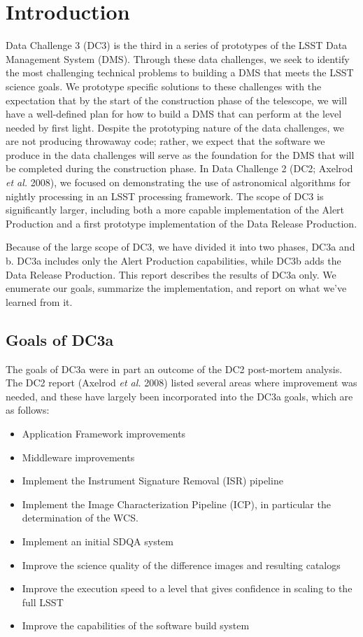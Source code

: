 
\section{Introduction}

Data Challenge 3 (DC3) is the third in a series of prototypes of the
LSST Data Management System (DMS). Through these data challenges, we
seek to identify the most challenging technical problems to building a
DMS that meets the LSST science goals. We prototype specific solutions
to these challenges with the expectation that by the start of the
construction phase of the telescope, we will have a well-defined plan
for how to build a DMS that can perform at the level needed by first
light. Despite the prototyping nature of the data challenges, we are
not producing throwaway code; rather, we expect that the software we
produce in the data challenges will serve as the foundation for the
DMS that will be completed during the construction phase.  In Data
Challenge 2 (DC2; Axelrod {\it et al.} 2008), we focused on
demonstrating the use of astronomical algorithms for nightly
processing in an LSST processing framework.  The scope of DC3 is
significantly larger, including both a more capable implementation of
the Alert Production and a first prototype implementation of the Data
Release Production.

Because of the large scope of DC3, we have divided it into two phases,
DC3a and b.  DC3a includes only the Alert Production capabilities,
while DC3b adds the Data Release Production.  This report describes
the results of DC3a only. We enumerate our goals, summarize the
implementation, and report on what we've learned from it.

\subsection{Goals of DC3a}

The goals of DC3a were in part an outcome of the DC2 post-mortem
analysis.  The DC2 report (Axelrod {\it et al.} 2008) listed several
areas where improvement was needed, and these have largely been
incorporated into the DC3a goals, which are as follows:

\begin{itemize}
\item Application Framework improvements
\item Middleware improvements
\item Implement the Instrument Signature Removal (ISR) pipeline
\item Implement the Image Characterization Pipeline (ICP), in
  particular the determination of the WCS.
\item Implement an initial SDQA system
\item Improve the science quality of the difference images and
  resulting catalogs
\item Improve the execution speed to a level that gives confidence in
  scaling to the full LSST
\item Improve the capabilities of the software build system
\end{itemize}

